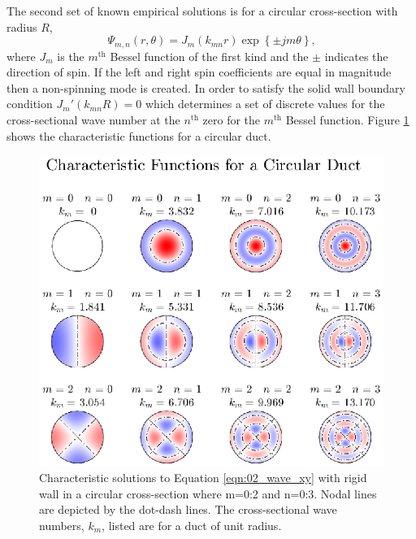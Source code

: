 The second set of known empirical solutions is for a circular cross-section with radius $R$,
\begin{equation}
  \Psi_{m,n}(r,\theta) = J_m(k_{mn}r)\exp\left\{\pm jm\theta\right\} \textrm{,}
  \label{eqn:02_psi_circ}
\end{equation}
where $J_m$ is the $m^\textrm{th}$ Bessel function of the first kind and the $\pm$ indicates the direction of spin.
If the left and right spin coefficients are equal in magnitude then a non-spinning mode is created.
In order to satisfy the solid wall boundary condition $J_m'(k_{mn}R) = 0$ which determines a set of discrete values for the cross-sectional wave number at the $n^\textrm{th}$ zero for the $m^\textrm{th}$ Bessel function.
Figure \ref{fig:02_cross_section_circ} shows the characteristic functions for a circular duct.
\begin{figure}
  \centering
  \includegraphics[width=\textwidth]{../matlab/02_background/cross_section_circ.eps}
  \caption{Characteristic solutions to Equation \ref{eqn:02_wave_xy} with rigid wall in a circular cross-section where m=0:2 and n=0:3.  Nodal lines are depicted by the dot-dash lines.  The cross-sectional wave numbers, $k_m$, listed are for a duct of unit radius.}
  \label{fig:02_cross_section_circ}
\end{figure}
